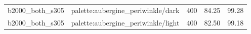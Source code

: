 \begin{longtable}{l>{\raggedright\arraybackslash}p{.42\linewidth}rrr}
b2000\_\allowbreak{}both\_\allowbreak{}s305 & %
palette:aubergine\_\allowbreak{}periwinkle/dark & %
400 & %
84.25 & %
99.28 \\ %

b2000\_\allowbreak{}both\_\allowbreak{}s305 & %
palette:aubergine\_\allowbreak{}periwinkle/light & %
400 & %
82.50 & %
99.18 \\ %


\end{longtable}
